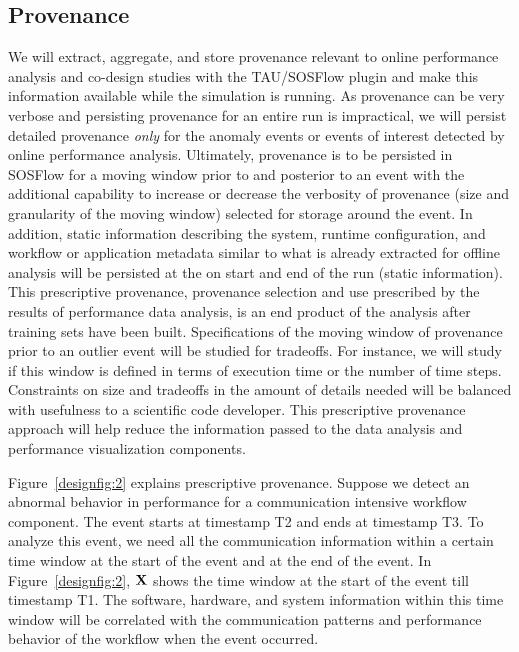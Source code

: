 \subsection{Provenance}
\label{subsection:features}
We will extract, aggregate, and store provenance relevant to online performance analysis and co-design studies with the TAU/SOSFlow plugin and make this information available while the simulation is running.  As provenance can be very verbose and persisting provenance for an entire run is impractical, we will persist detailed provenance {\em only} for the anomaly events or events of interest detected by online performance analysis.  Ultimately, provenance is to be persisted in SOSFlow for a moving window prior to and posterior to an event with the additional capability to increase or decrease the verbosity of provenance (size and granularity of the moving window) selected for storage around the event.  In addition, static information describing the system, runtime configuration, and  workflow or application metadata similar to what is already extracted for offline analysis will be persisted at the on start and end of the run (static information).  This prescriptive provenance,  provenance selection and use prescribed by the results of performance data analysis, is an end product of the analysis after training sets have been built.
Specifications of the moving window of provenance prior to an outlier event will be studied for tradeoffs.  For instance, we will study if this window is defined in terms of execution time or the number of time steps.  Constraints on size and tradeoffs in the amount of details needed will be balanced with usefulness to a scientific code developer.
This prescriptive provenance approach will help reduce the information passed to the data analysis and performance visualization components.

Figure~\ref{designfig:2} explains prescriptive provenance. Suppose we detect an abnormal behavior in performance for a communication intensive workflow component. The event starts at timestamp T2 and ends at timestamp T3. To analyze this event, we need all the communication information within a certain time window at the start of the event and at the end of the event. In Figure~\ref{designfig:2}, ${\bf{X}}$ shows the time window at the start of the event till timestamp T1. The software, hardware, and system information within this time window will be correlated with the communication patterns and performance behavior of the workflow when the event occurred.

